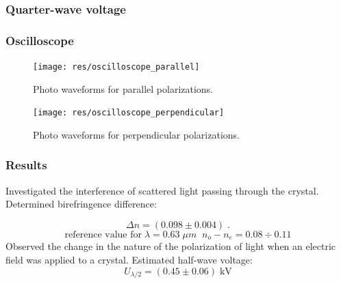 \documentclass{beamer}
\begin{document}
\begin{frame}
	\frametitle{Quarter-wave voltage}
	\begin{figure}
	\centering
    \end{figure}
\end{frame}
	
\begin{frame}
	\frametitle{Oscilloscope}
	\begin{figure}
		\centering
		\texttt{[image: res/oscilloscope\_parallel]}
		\caption{\footnotesize Photo waveforms for parallel polarizations.}
	\end{figure}
	\begin{figure}
		\centering
		\texttt{[image: res/oscilloscope\_perpendicular]}
		\caption{\footnotesize Photo waveforms for perpendicular polarizations.}
	\end{figure}
	
\end{frame}	
	
	
\begin{frame}
	\frametitle{Results}
	Investigated the interference of scattered light passing through the crystal.
	Determined birefringence difference:
	
	 $$\Delta n = (0.098 \pm 0.004) \; .$$
	 $$\text{reference value for} \;\lambda = 0.63 \; \mu m\;\; n_o - n_e = 0.08 \div 0.11$$
	 Observed the change in the nature of the polarization of light when an electric field was applied to a crystal. Estimated half-wave voltage:
	 $$U_{\lambda/2} = (0.45 \pm 0.06) \;\text{kV}$$
	
\end{frame}

	
\end{document}

